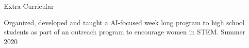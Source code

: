 \documentclass{resume}
\begin{document}
\begin{rSection}{Extra-Curricular} 
    \item Organized, developed and taught a AI-focused week long program to high school students as part of an outreach program to encourage women in STEM. \hfill Summer 2020
\end{rSection}
\end{document}

